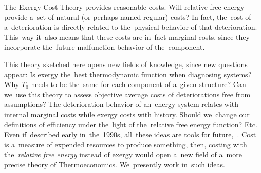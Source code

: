 \documentclass[energies,article,accept,moreauthors,pdftex]{Definitions/mdpi}
\begin{document}
The Exergy Cost Theory provides reasonable costs. Will relative free energy provide a~set of natural (or perhaps named regular) costs? In fact, the~cost of a~deterioration is directly related to the~physical behavior of that deterioration. This~way it~also means that these costs are in~fact marginal costs, since they incorporate the~future malfunction behavior of the~component.

This theory sketched here opens new fields of knowledge, since new questions appear:  Is exergy the~best thermodynamic function when diagnosing systems? Why $T_0$ needs to be the~same for each component of a~given structure? Can we~use this theory to assess objective average costs of deteriorations free from assumptions? The deterioration behavior of an~energy system relates with internal marginal costs while exergy costs with history. Should we~change our definitions of efficiency under the~light of the~relative free energy function? Etc. Even if~described early in~the~1990s, all~these ideas are tools for future,~\cite{Naredo2000}. Cost is a~measure of expended resources to produce something, then, costing with the~\emph{relative free energy} instead of exergy would open a~new field of a~more precise theory of Thermoeconomics. We~presently work in~such ideas.
\vspace{12pt}




\end{document}
